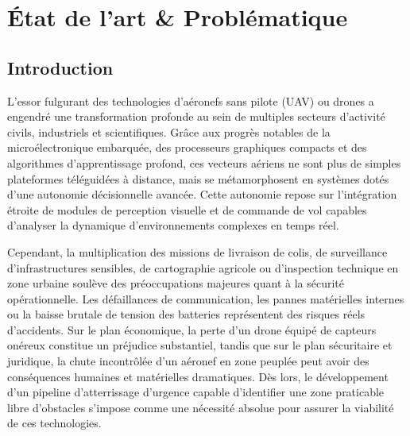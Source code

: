 \chapter{État de l'art \& Problématique}

\section{Introduction}

L'essor fulgurant des technologies d'aéronefs sans pilote (UAV) ou drones a engendré une transformation profonde au sein de multiples secteurs d'activité civils, industriels et scientifiques. Grâce aux progrès notables de la microélectronique embarquée, des processeurs graphiques compacts et des algorithmes d'apprentissage profond, ces vecteurs aériens ne sont plus de simples plateformes téléguidées à distance, mais se métamorphosent en systèmes dotés d'une autonomie décisionnelle avancée. Cette autonomie repose sur l'intégration étroite de modules de perception visuelle et de commande de vol capables d'analyser la dynamique d'environnements complexes en temps réel.

Cependant, la multiplication des missions de livraison de colis, de surveillance d'infrastructures sensibles, de cartographie agricole ou d'inspection technique en zone urbaine soulève des préoccupations majeures quant à la sécurité opérationnelle. Les défaillances de communication, les pannes matérielles internes ou la baisse brutale de tension des batteries représentent des risques réels d'accidents. Sur le plan économique, la perte d'un drone équipé de capteurs onéreux constitue un préjudice substantiel, tandis que sur le plan sécuritaire et juridique, la chute incontrôlée d'un aéronef en zone peuplée peut avoir des conséquences humaines et matérielles dramatiques. Dès lors, le développement d'un pipeline d'atterrissage d'urgence capable d'identifier une zone praticable libre d'obstacles s'impose comme une nécessité absolue pour assurer la viabilité de ces technologies.

